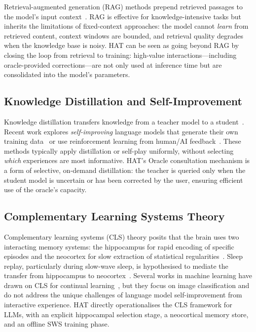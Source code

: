 Retrieval-augmented generation (RAG) methods prepend retrieved passages to the model's input context~\citep{lewis2020retrieval,guu2020realm,izacard2022atlas}.
RAG is effective for knowledge-intensive tasks but inherits the limitations of fixed-context approaches: the model cannot \emph{learn} from retrieved content, context windows are bounded, and retrieval quality degrades when the knowledge base is noisy.
HAT can be seen as going beyond RAG by closing the loop from retrieval to training: high-value interactions—including oracle-provided corrections—are not only used at inference time but are consolidated into the model's parameters.

\subsection{Knowledge Distillation and Self-Improvement}

Knowledge distillation transfers knowledge from a teacher model to a student~\citep{hinton2015distilling,sanh2019distilbert}.
Recent work explores \emph{self-improving} language models that generate their own training data~\citep{huang2023large,yuan2024self,chen2024self} or use reinforcement learning from human/AI feedback~\citep{ouyang2022training,bai2022constitutional}.
These methods typically apply distillation or self-play uniformly, without selecting \emph{which} experiences are most informative.
HAT's Oracle consultation mechanism is a form of selective, on-demand distillation: the teacher is queried only when the student model is uncertain or has been corrected by the user, ensuring efficient use of the oracle's capacity.

\subsection{Complementary Learning Systems Theory}

Complementary learning systems (CLS) theory posits that the brain uses two interacting memory systems: the hippocampus for rapid encoding of specific episodes and the neocortex for slow extraction of statistical regularities~\citep{mcclelland1995there,kumaran2016learning}.
Sleep replay, particularly during slow-wave sleep, is hypothesised to mediate the transfer from hippocampus to neocortex~\citep{rasch2013sleep,walker2017sleep}.
Several works in machine learning have drawn on CLS for continual learning~\citep{shin2017continual,van2020brain,arani2022learning}, but they focus on image classification and do not address the unique challenges of language model self-improvement from interactive experience.
HAT directly operationalises the CLS framework for LLMs, with an explicit hippocampal selection stage, a neocortical memory store, and an offline SWS training phase.
